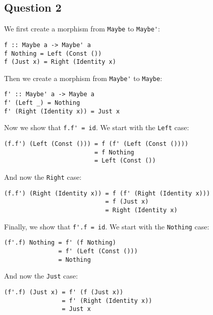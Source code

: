 \subsection*{Question 2}
We first create a morphism from \lstinline{Maybe} to \lstinline{Maybe'}:

\begin{lstlisting}
f :: Maybe a -> Maybe' a
f Nothing = Left (Const ())
f (Just x) = Right (Identity x)
\end{lstlisting}

Then we create a morphism from \lstinline{Maybe'} to \lstinline{Maybe}:

\begin{lstlisting}
f' :: Maybe' a -> Maybe a
f' (Left _) = Nothing
f' (Right (Identity x)) = Just x
\end{lstlisting}

Now we show that \lstinline{f.f' = id}. We start with the \lstinline{Left} case:

\begin{lstlisting}
(f.f') (Left (Const ())) = f (f' (Left (Const ())))
                         = f Nothing
                         = Left (Const ())
\end{lstlisting}

And now the \lstinline{Right} case:

\begin{lstlisting}
(f.f') (Right (Identity x)) = f (f' (Right (Identity x)))
                            = f (Just x)
                            = Right (Identity x)
\end{lstlisting}

Finally, we show that \lstinline{f'.f = id}. We start with the
\lstinline{Nothing} case:

\begin{lstlisting}
(f'.f) Nothing = f' (f Nothing)
               = f' (Left (Const ()))
               = Nothing
\end{lstlisting}

And now the \lstinline{Just} case:

\begin{lstlisting}
(f'.f) (Just x) = f' (f (Just x))
                = f' (Right (Identity x))
                = Just x
\end{lstlisting}
